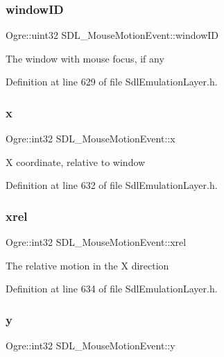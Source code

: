 \subsubsection{\texorpdfstring{window\+ID}{windowID}}
{\footnotesize\ttfamily Ogre\+::uint32 S\+D\+L\+\_\+\+Mouse\+Motion\+Event\+::window\+ID}

The window with mouse focus, if any 

Definition at line 629 of file Sdl\+Emulation\+Layer.\+h.

\mbox{\label{struct_s_d_l___mouse_motion_event_afb63357ab79b97c5177f698f98361bd5}} 
\subsubsection{\texorpdfstring{x}{x}}
{\footnotesize\ttfamily Ogre\+::int32 S\+D\+L\+\_\+\+Mouse\+Motion\+Event\+::x}

X coordinate, relative to window 

Definition at line 632 of file Sdl\+Emulation\+Layer.\+h.

\mbox{\label{struct_s_d_l___mouse_motion_event_a09f6ff4e8be12239421d5d2d279cb5f1}} 
\subsubsection{\texorpdfstring{xrel}{xrel}}
{\footnotesize\ttfamily Ogre\+::int32 S\+D\+L\+\_\+\+Mouse\+Motion\+Event\+::xrel}

The relative motion in the X direction 

Definition at line 634 of file Sdl\+Emulation\+Layer.\+h.

\mbox{\label{struct_s_d_l___mouse_motion_event_a5ec63d6686b27a2feb8f95073e4a4ad2}} 
\subsubsection{\texorpdfstring{y}{y}}
{\footnotesize\ttfamily Ogre\+::int32 S\+D\+L\+\_\+\+Mouse\+Motion\+Event\+::y}

